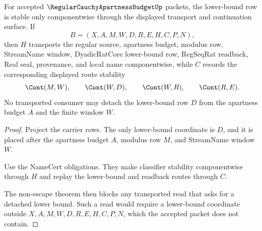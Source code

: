 \begin{theorem}
\label{thm:regular-cauchy-apartness-budget-transport-stability}
For accepted $\RegularCauchyApartnessBudgetUp$ packets, the lower-bound row is stable only componentwise through the displayed transport and continuation surface. If
$$
B=(X,A,M,W,D,R,E,H,C,P,N),
$$
then $H$ transports the regular source, apartness budget, modulus row, StreamName window, DyadicRatCore lower-bound row, RegSeqRat readback, Real seal, provenance, and local name componentwise, while $C$ records the corresponding displayed route stability
$$
\Cont(M,W),\qquad \Cont(W,D),\qquad \Cont(W,R),\qquad \Cont(R,E).
$$
No transported consumer may detach the lower-bound row $D$ from the apartness budget $A$ and the finite window $W$.
\end{theorem}
\begin{proof}
Project the carrier rows. The only lower-bound coordinate is $D$, and it is placed after the apartness budget $A$, modulus row $M$, and StreamName window $W$.

Use the NameCert obligations. They make classifier stability componentwise through $H$ and replay the lower-bound and readback routes through $C$.

The non-escape theorem then blocks any transported read that asks for a detached lower bound. Such a read would require a lower-bound coordinate outside $X,A,M,W,D,R,E,H,C,P,N$, which the accepted packet does not contain.
\end{proof}

